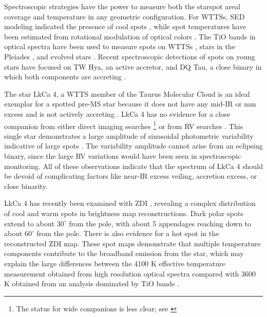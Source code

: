 \documentclass[twocolumn]{emulateapj}%
\newcommand{\name}{LkCa 4 }
\begin{document}
Spectroscopic strategies have the power to measure both the starspot areal coverage and temperature in any geometric configuration.  For WTTSs, SED modeling indicated the presence of cool spots \citep{wolk96}, while spot temperatures have been estimated from rotational modulation of optical colors \citep[e.g.][]{grankin98,venuti15,koen16}.  The TiO bands in optical spectra have been used to measure spots on WTTSs \citep{petrov94}, stars in the Pleiades \citep{fang2016}, and evolved stars \citep[e.g.][]{neff95,oneal01,oneal04}.  Recent spectroscopic detections of spots on young stars have focused on TW Hya, an active accretor, and DQ Tau, a close binary in which both components are accreting \citep{debes13,bary14}.  

The star LkCa 4, a WTTS member of the Taurus Molecular Cloud \citep{herbig86,strom89a,downes88,strom89b} is an ideal exemplar for a spotted pre-MS star because it does not have any mid-IR or mm excess \citep[\emph{e.g.}][]{andrews05,furlan06,buckle15} and is not actively accreting \citep[\emph{e.g.}][]{edwards06,cauley12}.  LkCa 4 has no evidence for a close companion from either direct imaging searches \citep{karr10,kraus11,daemgen15}\footnote{The status for wide companions is less clear; see \citet{stauffer91,itoh08,kraus09,kraus11,herczeg14}} or from RV searches \citep{nguyen12,donati14}.  This single star demonstrates a large amplitude of sinusoidal photometric variability indicative of large spots \citep{grankin08,xiao12}.  The variability amplitude cannot arise from an eclipsing binary, since the large RV variations would have been seen in spectroscopic monitoring.  All of these observations indicate that the spectrum of \name should be devoid of complicating factors like near-IR excess veiling, accretion excess, or close binarity.    

LkCa 4 has recently been examined with ZDI \citep{donati14}, revealing a complex distribution of cool and warm spots in brightness map reconstructions.  Dark polar spots extend to about $30^\circ$ from the pole, with about 5 appendages reaching down to about $60^\circ$ from the pole.  There is also evidence for a hot spot in the reconstructed ZDI map.  These spot maps demonstrate that multiple temperature components contribute to the broadband emission from the star, which may explain the large differences between the 4100 K effective temperature measurement obtained from high resolution optical spectra \citep{donati14} compared with 3600 K obtained from an analysis dominated by TiO bands \citep{herczeg14}.
\end{document}
